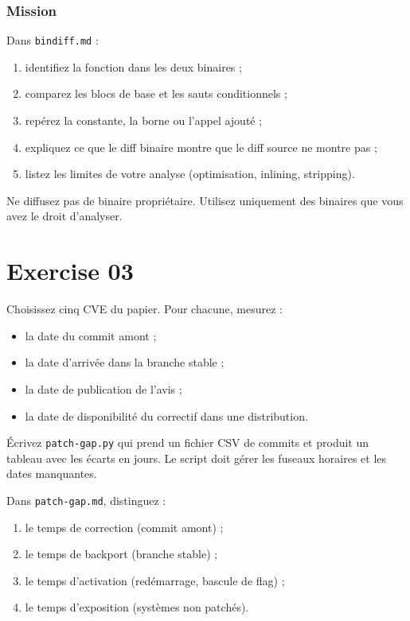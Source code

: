\documentclass{training}
\begin{document}
\subsection*{Mission}

Dans \texttt{bindiff.md} :

\begin{enumerate}
  \item identifiez la fonction dans les deux binaires ;
  \item comparez les blocs de base et les sauts conditionnels ;
  \item repérez la constante, la borne ou l'appel ajouté ;
  \item expliquez ce que le diff binaire montre que le diff source ne
        montre pas ;
  \item listez les limites de votre analyse (optimisation, inlining,
        stripping).
\end{enumerate}

\begin{warn}
Ne diffusez pas de binaire propriétaire. Utilisez uniquement des binaires
que vous avez le droit d'analyser.
\end{warn}

\chapter{Exercise 03}
\makeheaderfiles

Choisissez cinq CVE du papier. Pour chacune, mesurez :

\begin{itemize}
  \item la date du commit amont ;
  \item la date d'arrivée dans la branche stable ;
  \item la date de publication de l'avis ;
  \item la date de disponibilité du correctif dans une distribution.
\end{itemize}

Écrivez \texttt{patch-gap.py} qui prend un fichier CSV de commits et
produit un tableau avec les écarts en jours. Le script doit gérer les
fuseaux horaires et les dates manquantes.

Dans \texttt{patch-gap.md}, distinguez :

\begin{enumerate}
  \item le temps de correction (commit amont) ;
  \item le temps de backport (branche stable) ;
  \item le temps d'activation (redémarrage, bascule de flag) ;
  \item le temps d'exposition (systèmes non patchés).
\end{enumerate}
\end{document}
